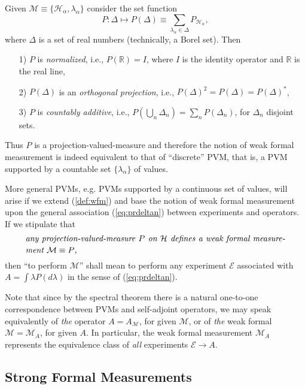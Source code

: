 \documentclass[12pt]{article}
\newcommand{\sa}{self-adjoint}
\newcommand{\PV}{projection-valued-measure}
\renewcommand{\a}{\alpha}
\newcommand{\la}{\lambda_{\a}}
\newcommand{\Ha}{{\H}_{\a}}
\renewcommand{\H}{\mbox{$\mathcal{H}$}}
\newcommand{\Pa}{ P_{ {\mathcal{H}_{\a} } } }
\newcommand{\R}{\mathbb{R}}
\newcommand{\E}{\mbox{$\mathscr{E}$}}
\newcommand{\M}{\mbox{$\mathcal{M}$}}
\begin{document}
Given $\M\equiv\{\Ha, \la \}$ consider the set function
\begin{equation}
P:\Delta\mapsto P (\Delta)\equiv \sum_{\la\in \Delta} \Pa,
\label{eq:disfr}
\end{equation}
where $\Delta$ is a set of real numbers (technically, a Borel set).
Then
\begin{itemize}
\item[1)] $P$ is \emph{normalized}, i.e., $P(\R)= I$, where $I$ is the
   identity operator and $\R$ is the real line,

\item[2)] $P(\Delta)$ is an \emph{orthogonal projection}, i.e.,
   $P(\Delta)^{2}=P(\Delta)=P(\Delta)^{*}$,

\item[3)] $P$ is \emph{countably additive}, i.e., $ P(\bigcup_{n}
   \Delta_n) = \sum_{n} P(\Delta_n)$, for $\Delta_n$ disjoint sets.
\end{itemize}
Thus $P$ is a \PV{} and therefore the notion of weak formal
measurement is indeed equivalent to that of ``discrete'' PVM, that is,
a PVM supported by a countable set $\{\la\}$ of values.


More general PVMs, e.g. PVMs supported by a continuous set of values,
will arise if we extend (\ref{def:wfm}) and base the notion of weak
formal measurement upon the general association (\ref{eq:prdeltan})
between experiments and operators. If we stipulate that
\begin{equation}
\mbox{%
\begin{minipage}{0.90\textwidth}\openup 1.4\jot
   \setlength{\baselineskip}{12pt}\emph{any \PV{} $P$ on $\H$ defines a
     weak formal measurement $\M\equiv P$,}
   \end{minipage}}
\label{def:wfmg}
\end{equation}
then ``to perform $\M$'' shall mean to perform any experiment $\E$
associated with $A=\int \lambda P(d\lambda)$ in the sense of
(\ref{eq:prdeltan}).

Note that since by the spectral theorem there is a natural one-to-one
correspondence between PVMs and \sa{} operators, we may speak
equivalently of \emph{the} operator $A=A_{\mathcal{M}}$, for given
$\M$, or of \emph{the} weak formal $\M=\M_A$, for given $A$.  In
particular, the weak formal measurement $\M_{A}$ represents the
equivalence class of \emph{all} experiments $\E{}\to A$.


\subsection{Strong Formal Measurements}
\end{document}
